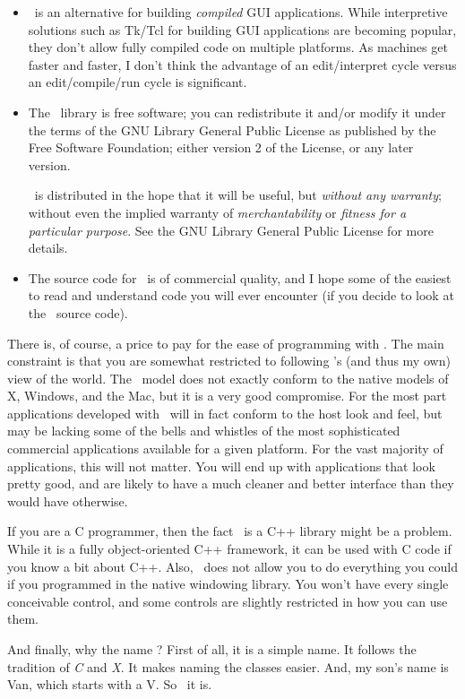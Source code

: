 \begin{itemize}
\item \V\ is an alternative for building \emph{compiled} GUI applications.
While interpretive solutions such as Tk/Tcl for building GUI
applications are becoming popular, they don't allow fully
compiled code on multiple platforms. As machines get faster and
faster, I don't think the advantage of an edit/interpret cycle
versus an edit/compile/run cycle is significant.

\item The \V\ library is free software; you can redistribute it and/or
modify it under the terms of the GNU Library General Public
License as published by the Free Software Foundation; either
version 2 of the License, or any later version.

\V\ is distributed in the hope that it will be useful,
but \emph{without any warranty}; without even the implied
warranty of \emph{merchantability} or \emph{fitness for a
particular purpose}.  See the GNU Library General Public License
for more details.

\item The source code for \V\ is of commercial quality, and I hope
some of the easiest to read and understand code you will ever
encounter (if you decide to look at the \V\ source code).

\end{itemize}

There is, of course, a price to pay for the ease of programming
with \V\@. The main constraint is that you are somewhat
restricted to following \V's (and thus my own) view of the
world. The \V\ model does not exactly conform to the native
models of X, Windows, and the Mac, but it is a very good
compromise.  For the most part applications developed with \V\
will in fact conform to the host look and feel, but may be
lacking some of the bells and whistles of the most sophisticated
commercial applications available for a given platform. For the
vast majority of applications, this will not matter. You will end
up with applications that look pretty good, and are likely to
have a much cleaner and better interface than they would have
otherwise.

If you are a C programmer, then the fact \V\ is a C++ library
might be a problem. While it is a fully object-oriented C++
framework, it can be used with C code if you know a bit about
C++. Also, \V\ does not allow you to do everything you could if
you programmed in the native windowing library. You won't have
every single conceivable control, and some controls are slightly
restricted in how you can use them.

And finally, why the name \V\@? 
First of all, it is a simple
name. It follows the tradition of \emph{C} and \emph{X}. It makes
naming the classes easier. And, my son's name is Van, which
starts with a V. So \V\ it is.
